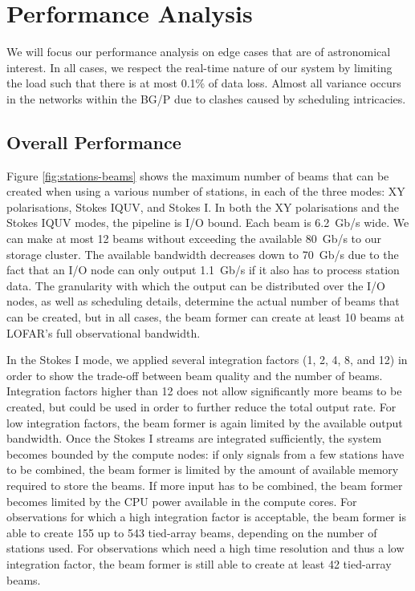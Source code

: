 \documentclass{llncs}
\begin{document}
\section{Performance Analysis}
\label{Sec:performance}

We will focus our performance analysis on edge cases that are of astronomical interest. In all cases, we respect the real-time nature of our system by limiting the load such that there is at most 0.1\% of data loss. Almost all variance occurs in the networks within the BG/P due to clashes caused by scheduling intricacies.

\subsection{Overall Performance}

Figure \ref{fig:stations-beams} shows the maximum number of beams that can be created when using a various number of stations, in each of the three modes: XY polarisations, Stokes IQUV, and Stokes I. In both the XY polarisations and the Stokes IQUV modes, the pipeline is I/O bound. Each beam is 6.2~Gb/s wide. We can make at most 12 beams without exceeding the available 80~Gb/s to our storage cluster. The available bandwidth decreases down to 70~Gb/s due to the fact that an I/O node can only output 1.1~Gb/s if it also has to process station data. The granularity with which the output can be distributed over the I/O nodes, as well as scheduling details, determine the actual number of beams that can be created, but in all cases, the beam former can create at least 10 beams at LOFAR's full observational bandwidth.

In the Stokes I mode, we applied several integration factors (1, 2, 4, 8, and 12) in order to show the trade-off between beam quality and the number of beams. Integration factors higher than 12 does not allow significantly more beams to be created, but could be used in order to further reduce the total output rate. For low integration factors, the beam former is again limited by the available output bandwidth. Once the Stokes I streams are integrated sufficiently, the system becomes bounded by the compute nodes: if only signals from a few stations have to be combined, the beam former is limited by the amount of available memory required to store the beams. If more input has to be combined, the beam former becomes limited by the CPU power available in the compute cores. For observations for which a high integration factor is acceptable, the beam former is able to create 155 up to 543 tied-array beams, depending on the number of stations used. For observations which need a high time resolution and thus a low integration factor, the beam former is still able to create at least 42 tied-array beams.
\end{document}
